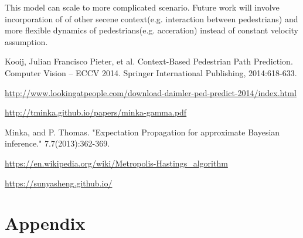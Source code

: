 \documentclass[10pt,twocolumn,letterpaper]{article}
\begin{document}
    This model can scale to more complicated scenario. Future work will involve 
    incorporation of of other secene context(e.g. interaction between pedestrians)
    and more flexible dynamics of pedestrians(e.g. acceration) instead of constant
    velocity assumption. 
    
    {\small
    
    
    }
    \begin{thebibliography}{1}

    Kooij, Julian Francisco Pieter, et al. Context-Based Pedestrian Path Prediction. Computer Vision – ECCV 2014. Springer International Publishing, 2014:618-633.
   
    \url{http://www.lookingatpeople.com/download-daimler-ped-predict-2014/index.html}
    
    \url{http://tminka.github.io/papers/minka-gamma.pdf}
    
    Minka, and P. Thomas. "Expectation Propagation for approximate Bayesian inference." 7.7(2013):362-369.
    
    \url{https://en.wikipedia.org/wiki/Metropolis-Hastings_algorithm}

    \url{https://sunyasheng.github.io/}
    

    \end{thebibliography}

    \section{Appendix}
\end{document}
